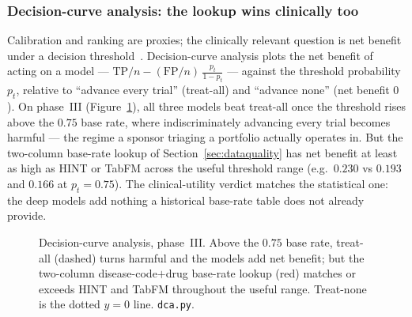 \documentclass[a4paper,fleqn]{cas-sc}
\begin{document}
\subsubsection{Decision-curve analysis: the lookup wins clinically too}
\label{sec:dca}
Calibration and ranking are proxies; the clinically relevant question is net benefit under a
decision threshold~\citep{fritz2024effect}. Decision-curve analysis plots the net benefit of
acting on a model --- $\mathrm{TP}/n - (\mathrm{FP}/n)\,\tfrac{p_t}{1-p_t}$ --- against the
threshold probability $p_t$, relative to ``advance every trial'' (treat-all) and ``advance
none'' (net benefit $0$). On phase~III (Figure~\ref{fig:dca}), all three models beat treat-all
once the threshold rises above the $0.75$ base rate, where indiscriminately advancing every
trial becomes harmful --- the regime a sponsor triaging a portfolio actually operates in. But
the two-column base-rate lookup of Section~\ref{sec:dataquality} has net benefit at least as
high as HINT or TabFM across the useful threshold range (e.g.\ $0.230$ vs $0.193$ and $0.166$
at $p_t{=}0.75$). The clinical-utility verdict matches the statistical one: the deep models add
nothing a historical base-rate table does not already provide.
\begin{figure}[htbp]
\centering
{}
\caption{Decision-curve analysis, phase~III. Above the $0.75$ base rate, treat-all
(dashed) turns harmful and the models add net benefit; but the two-column disease-code$+$drug
base-rate lookup (red) matches or exceeds HINT and TabFM throughout the useful range. Treat-none
is the dotted $y{=}0$ line. \texttt{dca.py}.}
\label{fig:dca}
\end{figure}
\end{document}
